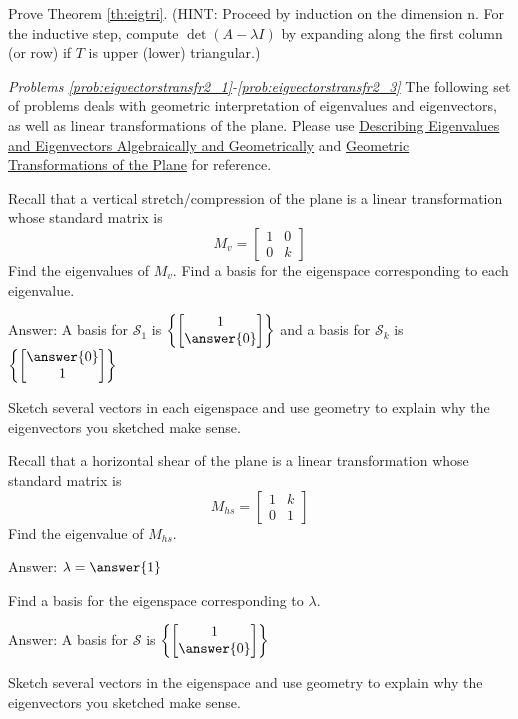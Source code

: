 \documentclass{ximera}
\begin{document}
    
\begin{problem}\label{prob:eigtri}
Prove Theorem \ref{th:eigtri}.  (HINT:  Proceed by induction on the dimension n.  For the inductive step, compute $\det(A-\lambda I)$ by expanding along the first column (or row) if $T$ is upper (lower) triangular.)
\end{problem}
    
\emph{Problems \ref{prob:eigvectorstransfr2_1}-\ref{prob:eigvectorstransfr2_3}}
The following set of problems deals with geometric interpretation of eigenvalues and eigenvectors, as well as linear transformations of the plane.  Please use \href{https://ximera.osu.edu/oerlinalg/LinearAlgebra/EIG-0010/main}{Describing Eigenvalues and Eigenvectors Algebraically and Geometrically} and \href{https://ximera.osu.edu/oerlinalg/LinearAlgebra/LTR-0070/main}{Geometric Transformations of the Plane} for reference.
    
\begin{problem}\label{prob:eigvectorstransfr2_1}
Recall that a vertical stretch/compression of the plane is a linear transformation whose standard matrix is $$M_v=\begin{bmatrix}1&0\\0&k\end{bmatrix}$$
Find the eigenvalues of $M_v$.  Find a basis for the eigenspace corresponding to each eigenvalue.
    
Answer:  A basis for $\mathcal{S}_1$ is $\left\{\begin{bmatrix}1\\\answer{0}\end{bmatrix}\right\}$
and a basis for $\mathcal{S}_k$ is $\left\{\begin{bmatrix}\answer{0}\\1\end{bmatrix}\right\}$
    
Sketch several vectors in each eigenspace and use geometry to explain why the eigenvectors you sketched make sense.
\end{problem}
    
\begin{problem}\label{prob:eigvectorstransfr2_2}
Recall that a horizontal shear of the plane is a linear transformation whose standard matrix is $$M_{hs}=\begin{bmatrix}1&k\\0&1\end{bmatrix}$$
Find the eigenvalue of $M_{hs}$. 
    
Answer: $\lambda=\answer{1}$
    
Find a basis for the eigenspace corresponding to $\lambda$.
    
Answer:  A basis for $\mathcal{S}$ is $\left\{\begin{bmatrix}1\\\answer{0}\end{bmatrix}\right\}$
    
Sketch several vectors in the eigenspace and use geometry to explain why the eigenvectors you sketched make sense.
\end{problem}
    
\end{document}
